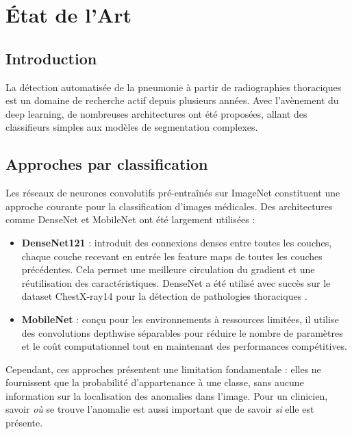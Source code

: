 \documentclass[12pt,a4paper,twoside]{report}
\begin{document}
\chapter{État de l'Art}

\section{Introduction}

La détection automatisée de la pneumonie à partir de radiographies thoraciques est un domaine de recherche actif depuis plusieurs années. Avec l'avènement du deep learning, de nombreuses architectures ont été proposées, allant des classifieurs simples aux modèles de segmentation complexes.

\section{Approches par classification}

Les réseaux de neurones convolutifs pré-entraînés sur ImageNet constituent une approche courante pour la classification d'images médicales. Des architectures comme DenseNet \cite{densenet} et MobileNet \cite{mobilenet} ont été largement utilisées :

\begin{itemize}
  \item \textbf{DenseNet121} : introduit des connexions denses entre toutes les couches, chaque couche recevant en entrée les feature maps de toutes les couches précédentes. Cela permet une meilleure circulation du gradient et une réutilisation des caractéristiques. DenseNet a été utilisé avec succès sur le dataset ChestX-ray14 pour la détection de pathologies thoraciques \cite{wang2017chestx-ray14}.
  
  \item \textbf{MobileNet} : conçu pour les environnements à ressources limitées, il utilise des convolutions depthwise séparables pour réduire le nombre de paramètres et le coût computationnel tout en maintenant des performances compétitives.
\end{itemize}

Cependant, ces approches présentent une limitation fondamentale : elles ne fournissent que la probabilité d'appartenance à une classe, sans aucune information sur la localisation des anomalies dans l'image. Pour un clinicien, savoir \textit{où} se trouve l'anomalie est aussi important que de savoir \textit{si} elle est présente.
\end{document}
